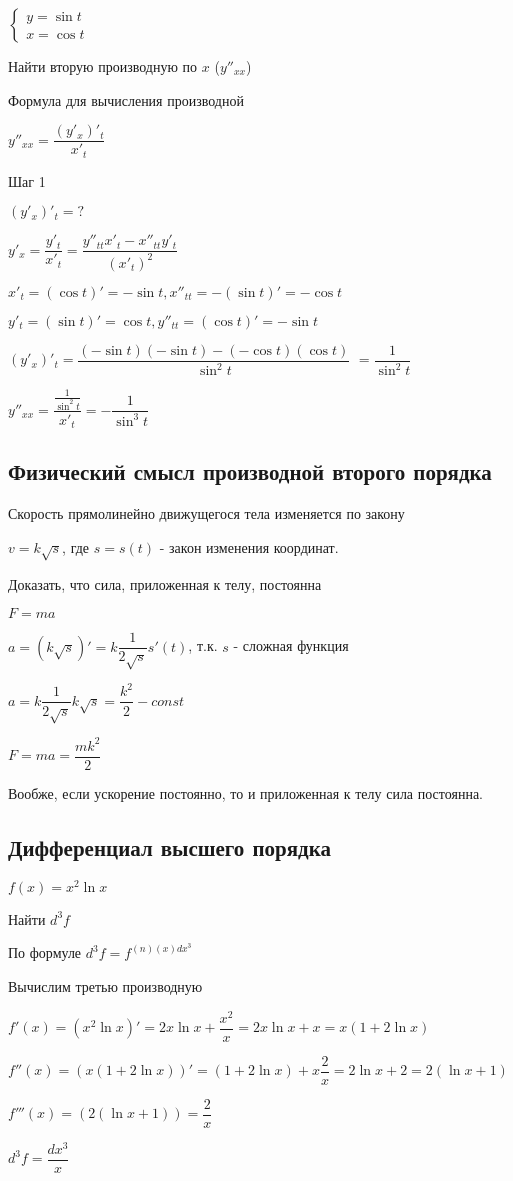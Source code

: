 $\begin{cases}
y = \sin t \\
x = \cos t
\end{cases}$

Найти вторую производную по $ x $ ($ y''_{xx} $)

Формула для вычисления производной

$ y''_{xx} = \dfrac{(y'_{x})'_{t}}{x'_{t}}$


Шаг 1

$ (y'_{x})'_{t} = ? $

$ y'_{x} = \dfrac{y'_{t}}{x'_{t}} = \dfrac{y''_{tt}x'_{t} - x''_{tt}y'_{t} }{(x'_{t})^{2}} $

$ x'_{t} = (\cos t)' = -\sin t, x''_{tt} = -(\sin t)' = -\cos t $

$ y'_{t} = (\sin t)' = \cos t, y''_{tt} = (\cos t)' = - \sin t $

$ (y'_{x})'_{t} = \dfrac{(- \sin t)(- \sin t) - (- \cos t)(\cos t) }{\sin^{2} t} $
$ = \dfrac{1}{\sin^{2} t} $

$ y''_{xx} = \dfrac{\frac{1}{\sin^{2} t}}{x'_{t}} = - \dfrac{1}{\sin^{3} t} $

\subsection{Физический смысл производной второго порядка}

Скорость прямолинейно движущегося тела изменяется по закону

$ v = k\sqrt{s} $, где $ s = s(t) $ - закон изменения координат.

Доказать, что сила, приложенная к телу, постоянна

$ F = ma $

$ a = (k\sqrt{s})' = k \dfrac{1}{2\sqrt{s}} s'(t)$, т.к. $ s $ - сложная функция

$ a = k \dfrac{1}{2\sqrt{s}} k\sqrt{s} = \dfrac{k^{2}}{2} - const$ 

$ F = ma = \dfrac{mk^{2}}{2} $

Вообже, если ускорение постоянно, то и приложенная к телу сила постоянна.


\subsection{Дифференциал высшего порядка}

$ f(x) = x^{2} \ln x $

Найти $ d^{3}f $

По формуле $ d^{3}f = f^{(n)(x) dx^{3}} $

Вычислим третью производную

$ f'(x) = (x^{2} \ln x)' = 2x \ln x + \dfrac{x^{2}}{x} = 2x \ln x + x = x(1 + 2 \ln x) $

$ f''(x) = (x(1 + 2 \ln x))' = (1 + 2 \ln x) + x \dfrac{2}{x} = 2 \ln x + 2 = 2 (\ln x + 1) $

$ f'''(x) = (2 (\ln x + 1)) = \dfrac{2}{x} $

$ d^{3}f = \dfrac{dx^{3}}{x} $